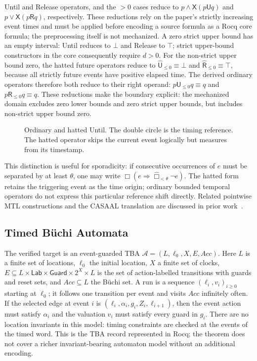 \documentclass[10pt,journal,compsoc]{IEEEtran}
\newcommand{\Until}{\mathbin{\mathsf{U}}}
\newcommand{\Release}{\mathbin{\mathsf{R}}}
\newcommand{\hUntil}{\mathbin{\widehat{\mathsf{U}}}}
\newcommand{\hRelease}{\mathbin{\widehat{\mathsf{R}}}}
\newcommand{\Next}{\mathsf{X}}
\begin{document}
Until and Release operators, and the $>0$ cases reduce to
$p\land\Next(p\Until q)$ and $p\lor\Next(p\Release q)$,
respectively. These reductions rely on the paper's strictly increasing event
times and must be applied before encoding a source formula as a Rocq core
formula; the preprocessing itself is not mechanized. A zero strict
upper bound has an empty interval: Until reduces to $\bot$ and Release to
$\top$; strict upper-bound constructors in the core consequently require
$d>0$. For the non-strict upper bound zero, the hatted future operators reduce
to $\hUntil_{\le0}\equiv\bot$ and $\hRelease_{\le0}\equiv\top$, because all
strictly future events have positive elapsed time. The derived ordinary
operators therefore both reduce to their right operand:
$p\Until_{\le0}q\equiv q$ and $p\Release_{\le0}q\equiv q$. These reductions
make the boundary explicit: the mechanized domain excludes zero lower bounds
and zero strict upper bounds, but includes non-strict upper bound zero.

\begin{figure}[t]
\centering

\caption{Ordinary and hatted Until. The double circle is the timing reference.
The hatted operator skips the current event logically but measures from its
timestamp.}
\label{fig:hatted-until}
\end{figure}

This distinction is useful for sporadicity: if consecutive occurrences of
$e$ must be separated by at least $\theta$, one may write
$\Box(e\Rightarrow\widehat{\Box}_{<\theta}\neg e)$. The hatted form retains
the triggering event as the time origin; ordinary bounded temporal
operators do not express this particular reference shift directly.
Related pointwise MTL constructions and the CASAAL translation are discussed
in prior work~\cite{ouaknine_worrell_lics05,bouyer_chevalier_markey_fsttcs05,li_spin7,casaal_tool}.

\subsection{Timed B\"uchi Automata}
\label{sec:tba}
The verified target is an event-guarded TBA
$\mathcal A=(L,\ell_0,X,E,\mathit{Acc})$. Here $L$ is a finite set of
locations, $\ell_0$ the initial location, $X$ a finite set of clocks,
$E\subseteq L\times\mathsf{Lab}\times\mathsf{Guard}\times 2^X\times L$
is the set of action-labelled transitions with guards and reset sets, and
$\mathit{Acc}\subseteq L$ the B\"uchi set. A run is a sequence
$(\ell_i,v_i)_{i\ge0}$ starting at $\ell_0$; it follows one transition per
event and visits $\mathit{Acc}$ infinitely often. If the selected edge at
event $i$ is $(\ell_i,\alpha_i,g_i,Z_i,\ell_{i+1})$, then the event action
must satisfy $\alpha_i$ and the valuation $v_i$ must satisfy every guard in
$g_i$. There are no location invariants in this model: timing constraints
are checked at the events of the timed word. This is the TBA record
represented in Rocq; the theorem does not cover a richer invariant-bearing
automaton model without an additional encoding.
\end{document}
